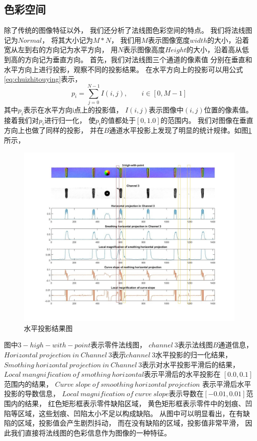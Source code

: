\subsection{色彩空间}

除了传统的图像特征以外，
我们还分析了法线图色彩空间的特点。
我们将法线图记为$Normal$，
将其大小记为$M*N$，
我们用$M$表示图像宽度$width$的大小，沿着宽从左到右的方向记为水平方向，
用$N$表示图像高度$Height$的大小，沿着高从低到高的方向记为垂直方向。
首先，我们对法线图三个通道的像素值
分别在垂直和水平方向上进行投影，观察不同的投影结果。
在水平方向上的投影可以用公式
\eqref{eq:chuizhitouying}表示，
\begin{equation}
p_i=\sum_{j=0}^{N-1} I(i,j),\qquad i\in \left[ 0,M-1\right]
\label{eq:chuizhitouying}
\end{equation}
其中$p_i$表示在水平方向i点上的投影值，
$I(i,j)$表示图像中$(i,j)$位置的像素值。
接着我们对$p_i$进行归一化，
使$p_i$的值都处于$[0,1.0]$的范围内。
我们对图像在垂直方向上也做了同样的投影，
并在$B$通道水平投影上发现了明显的统计规律。如图\ref{fig:secaitongying}所示，
\begin{figure}[htbp]
\centering
\includegraphics[width=1.0\linewidth]{figures/secaikongjian.png}
\caption{水平投影结果图}
\label{fig:secaitongying}
\end{figure}
图中$3-high-with-point$表示零件法线图，
$channel~3$表示法线图$B$通道信息，
$Horizontal~projection~in~Channel~3$表示$channel~3$水平投影的归一化结果，
$Smothing~horizontal~projection~in~Channel~3$表示对水平投影平滑后的结果，
$Local~mangnification~of~smothing~horizontal$表示平滑后的水平投影在
$[0.0,0.1]$范围内的结果，
$Curve~slope~of~smoothing~horizontal~projection$
表示平滑后水平投影的导数信息，
$Local~magnification~of~curve~slope$表示导数在$[-0.01,0.01]$范围内的结果，
红色矩形框表示零件缺陷区域，
黄色矩形框表示零件中的划痕、凹陷等区域，这些划痕、凹陷太小不足以构成缺陷。
从图中可以明显看出，在有缺陷的区域，投影值会产生剧烈抖动，
而在没有缺陷的区域，投影值非常平滑，
因此我们直接将法线图的色彩信息作为图像的一种特征。

